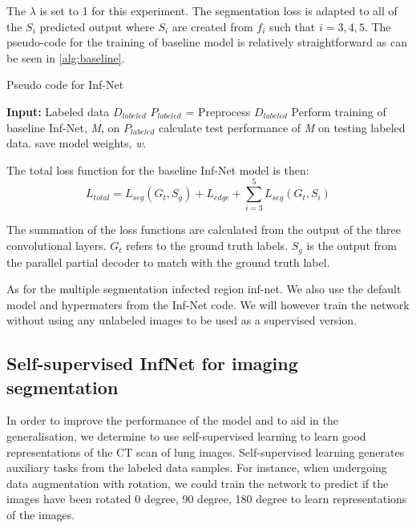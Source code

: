 The $\lambda$ is set to 1 for this experiment. The segmentation loss is adapted to all of the ${S_i}$ predicted output where ${S_i}$ are created from $f_i$ such that $i={3,4,5}$. The pseudo-code for the training of baseline model is relatively straightforward as can be seen in \ref{alg:baseline}.
\begin{algorithm}
	\caption{Pseudo code for Inf-Net}
	\label{alg:baseline}
\begin{algorithmic}
\STATE \textbf{Input:} Labeled data $D_{labeled}$
\STATE $P_{labeled}$ = Preprocess $D_{labeled}$
\STATE Perform training of baseline Inf-Net, \textit{M}, on $P_{labeled}$
\STATE calculate test performance of \textit{M} on testing labeled data.
\STATE save model weights, \textit{w}.
\ENDFOR
\end{algorithmic}
\end{algorithm}

The total loss function for the baseline Inf-Net model is then:
\begin{equation}
L_{total} = L_{seg}(G_t, S_g) + L_{edge} + 	\sum_{i=3}^{5}L_{seg}(G_t, S_i)
\end{equation}

The summation of the loss functions are calculated from the output of the three convolutional layers. $G_t$ refers to the ground truth labels. $S_g$ is the output from the parallel partial decoder to match with the ground truth label.

As for the multiple segmentation infected region inf-net. We also use the default model and hypermaters from the Inf-Net code. We will however train the network without using any unlabeled images to be used as a supervised version.

\subsection{Self-supervised InfNet for imaging segmentation}
In order to improve the performance of the model and to aid in the generalisation, we  determine to use self-supervised learning to learn good representations of the CT scan of lung images. Self-supervised learning generates auxiliary tasks from the labeled data samples. For instance, when undergoing data augmentation with rotation, we could train the network to predict if the images have been rotated 0 degree, 90 degree, 180 degree to learn representations of the images. 

